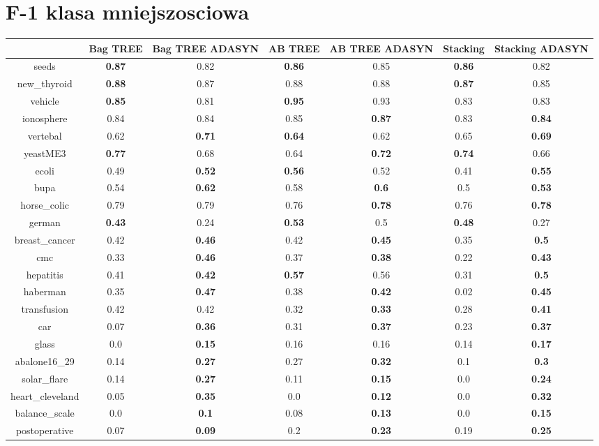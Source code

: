 \documentclass{article}%
\begin{document}
%
\section*{F{-}1 klasa mniejszosciowa}%
\begin{tabular}{c|cccccc}%
&Bag TREE&Bag TREE ADASYN&AB TREE&AB TREE ADASYN&Stacking&Stacking ADASYN\\%
\hline%
seeds&\textbf{0.87}&0.82&\textbf{0.86}&0.85&\textbf{0.86}&0.82\\%
new\_thyroid&\textbf{0.88}&0.87&0.88&0.88&\textbf{0.87}&0.85\\%
vehicle&\textbf{0.85}&0.81&\textbf{0.95}&0.93&0.83&0.83\\%
ionosphere&0.84&0.84&0.85&\textbf{0.87}&0.83&\textbf{0.84}\\%
vertebal&0.62&\textbf{0.71}&\textbf{0.64}&0.62&0.65&\textbf{0.69}\\%
yeastME3&\textbf{0.77}&0.68&0.64&\textbf{0.72}&\textbf{0.74}&0.66\\%
ecoli&0.49&\textbf{0.52}&\textbf{0.56}&0.52&0.41&\textbf{0.55}\\%
bupa&0.54&\textbf{0.62}&0.58&\textbf{0.6}&0.5&\textbf{0.53}\\%
horse\_colic&0.79&0.79&0.76&\textbf{0.78}&0.76&\textbf{0.78}\\%
german&\textbf{0.43}&0.24&\textbf{0.53}&0.5&\textbf{0.48}&0.27\\%
breast\_cancer&0.42&\textbf{0.46}&0.42&\textbf{0.45}&0.35&\textbf{0.5}\\%
cmc&0.33&\textbf{0.46}&0.37&\textbf{0.38}&0.22&\textbf{0.43}\\%
hepatitis&0.41&\textbf{0.42}&\textbf{0.57}&0.56&0.31&\textbf{0.5}\\%
haberman&0.35&\textbf{0.47}&0.38&\textbf{0.42}&0.02&\textbf{0.45}\\%
transfusion&0.42&0.42&0.32&\textbf{0.33}&0.28&\textbf{0.41}\\%
car&0.07&\textbf{0.36}&0.31&\textbf{0.37}&0.23&\textbf{0.37}\\%
glass&0.0&\textbf{0.15}&0.16&0.16&0.14&\textbf{0.17}\\%
abalone16\_29&0.14&\textbf{0.27}&0.27&\textbf{0.32}&0.1&\textbf{0.3}\\%
solar\_flare&0.14&\textbf{0.27}&0.11&\textbf{0.15}&0.0&\textbf{0.24}\\%
heart\_cleveland&0.05&\textbf{0.35}&0.0&\textbf{0.12}&0.0&\textbf{0.32}\\%
balance\_scale&0.0&\textbf{0.1}&0.08&\textbf{0.13}&0.0&\textbf{0.15}\\%
postoperative&0.07&\textbf{0.09}&0.2&\textbf{0.23}&0.19&\textbf{0.25}\\%
\end{tabular}
\end{document}
